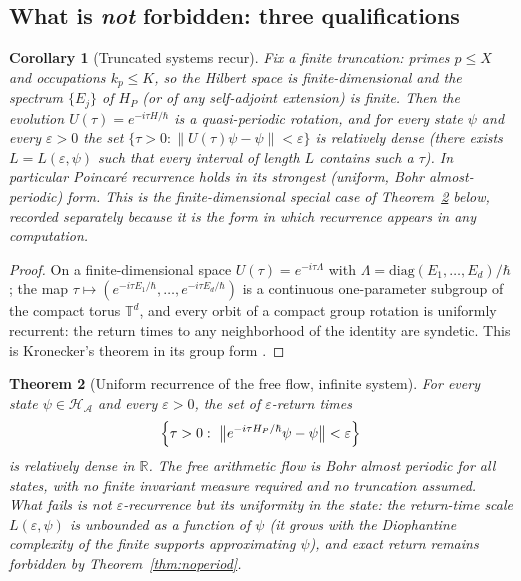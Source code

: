 \documentclass[11pt,a4paper]{article}
\theoremstyle{plain}
\newtheorem{theorem}{Theorem}[section]
\newtheorem{corollary}[theorem]{Corollary}
\theoremstyle{definition}
\theoremstyle{remark}
\newcommand{\Rr}{\mathbb{R}}
\newcommand{\Hil}{\mathcal{H}}
\begin{document}
\subsection{What is \emph{not} forbidden: three qualifications}

\begin{corollary}[Truncated systems recur]\label{cor:truncatedrecurrence}
Fix a finite truncation: primes $p\leq X$ and occupations $k_{p}\leq K$, so the Hilbert space
is finite-dimensional and the spectrum $\{E_{j}\}$ of $H_{P}$ (or of any self-adjoint
extension) is finite. Then the evolution $U(\tau)=e^{-i\tau H/\hbar}$ is a quasi-periodic
rotation, and for every state $\psi$ and every $\varepsilon>0$ the set
$\{\tau>0:\|U(\tau)\psi-\psi\|<\varepsilon\}$ is \emph{relatively dense} (there exists
$L=L(\varepsilon,\psi)$ such that every interval of length $L$ contains such a $\tau$). In
particular Poincar\'e recurrence holds in its strongest (uniform, Bohr almost-periodic) form.
This is the finite-dimensional special case of Theorem~\ref{cor:nopoincare} below, recorded
separately because it is the form in which recurrence appears in any \emph{computation}.
\end{corollary}

\begin{proof}
On a finite-dimensional space $U(\tau)=e^{-i\tau\Lambda}$ with
$\Lambda=\mathrm{diag}(E_{1},\dots,E_{d})/\hbar$; the map $\tau\mapsto
(e^{-i\tau E_{1}/\hbar},\dots,e^{-i\tau E_{d}/\hbar})$ is a continuous one-parameter
subgroup of the compact torus $\mathbb{T}^{d}$, and every orbit of a compact group rotation is
uniformly recurrent: the return times to any neighborhood of the identity are syndetic. This
is Kronecker's theorem in its group form \cite{hardywright2008}.
\end{proof}

\begin{theorem}[Uniform recurrence of the free flow, infinite system]\label{cor:nopoincare}
For \emph{every} state $\psi\in\Hil_{\mathcal{A}}$ and every $\varepsilon>0$, the set of
$\varepsilon$-return times
\begin{equation}
\Bigl\{\tau>0:\ \bigl\|e^{-i\tau H_{P}/\hbar}\psi-\psi\bigr\|<\varepsilon\Bigr\}
\end{equation}
is \emph{relatively dense} in $\Rr$. The free arithmetic flow is Bohr almost periodic for
all states, with no finite invariant measure required and no truncation assumed. What fails
is not $\varepsilon$-recurrence but its \emph{uniformity in the state}: the return-time
scale $L(\varepsilon,\psi)$ is unbounded as a function of $\psi$ (it grows with the
Diophantine complexity of the finite supports approximating $\psi$), and exact return
remains forbidden by Theorem~\ref{thm:noperiod}.
\end{theorem}
\end{document}
